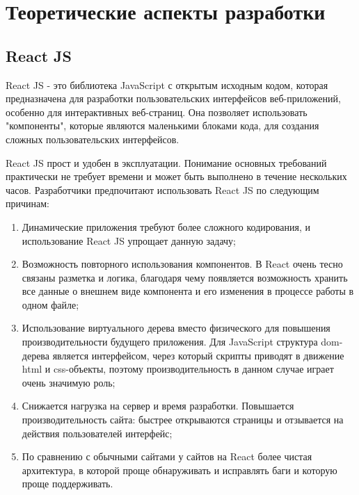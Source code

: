 \documentclass[master, och, pract]{SCWorks}
\begin{document}
\newpage
\section{Теоретические аспекты разработки}
\subsection{React JS}
React JS - это библиотека JavaScript с открытым исходным кодом, которая предназначена для разработки пользовательских интерфейсов веб-приложений, особенно для интерактивных веб-страниц. Она позволяет использовать "компоненты", которые являются маленькими блоками кода, для создания сложных пользовательских интерфейсов.

React JS прост и удобен в эксплуатации. Понимание основных требований практически не требует времени и может быть выполнено в течение нескольких часов. Разработчики предпочитают использовать React JS по следующим причинам:
\begin{enumerate}
    \item Динамические приложения требуют более сложного кодирования, и использование React JS упрощает данную задачу;
    \item Возможность повторного использования компонентов. В React очень тесно связаны разметка и логика, благодаря чему появляется возможность хранить все данные о внешнем виде компонента и его изменения в процессе работы в одном файле;
    \item Использование виртуального дерева вместо физического для повышения производительности будущего приложения. Для JavaScript структура dom-дерева является интерфейсом, через который скрипты приводят в движение html и css-объекты, поэтому производительность в данном случае играет очень значимую роль;
    \item Снижается нагрузка на сервер и время разработки. Повышается производительность сайта: быстрее открываются страницы и отзывается на действия пользователей интерфейс;
    \item По сравнению с обычными сайтами у сайтов на React более чистая архитектура, в которой проще обнаруживать и исправлять баги и которую проще поддерживать. \cite{rjs_vs_rn}\cite{rjs}
\end{enumerate}
\end{document}
